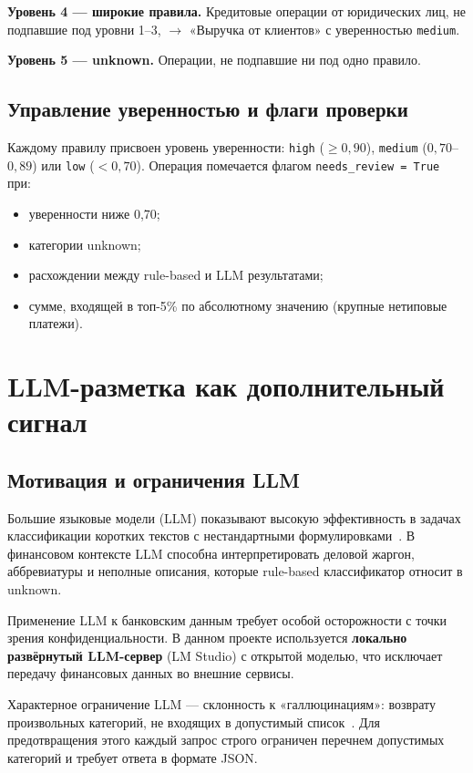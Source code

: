 \textbf{Уровень 4 --- широкие правила.} Кредитовые операции от юридических лиц, не подпавшие под уровни 1--3, $\to$ «Выручка от клиентов» с уверенностью \texttt{medium}.

\textbf{Уровень 5 --- unknown.} Операции, не подпавшие ни под одно правило.

\subsection{Управление уверенностью и флаги проверки}

Каждому правилу присвоен уровень уверенности: \texttt{high} ($\geq 0{,}90$), \texttt{medium} ($0{,}70$--$0{,}89$) или \texttt{low} ($< 0{,}70$). Операция помечается флагом \texttt{needs\_review~=~True} при:
\begin{itemize}
  \item уверенности ниже 0{,}70;
  \item категории unknown;
  \item расхождении между rule-based и LLM результатами;
  \item сумме, входящей в топ-5\% по абсолютному значению (крупные нетиповые платежи).
\end{itemize}

\section{LLM-разметка как дополнительный сигнал}

\subsection{Мотивация и ограничения LLM}

Большие языковые модели (LLM) показывают высокую эффективность в задачах классификации коротких текстов с нестандартными формулировками~\cite{brown2020language}. В финансовом контексте LLM способна интерпретировать деловой жаргон, аббревиатуры и неполные описания, которые rule-based классификатор относит в unknown.

Применение LLM к банковским данным требует особой осторожности с точки зрения конфиденциальности. В данном проекте используется \textbf{локально развёрнутый LLM-сервер} (LM Studio) с открытой моделью, что исключает передачу финансовых данных во внешние сервисы.

Характерное ограничение LLM --- склонность к «галлюцинациям»: возврату произвольных категорий, не входящих в допустимый список~\cite{ji2023survey}. Для предотвращения этого каждый запрос строго ограничен перечнем допустимых категорий и требует ответа в формате JSON.

